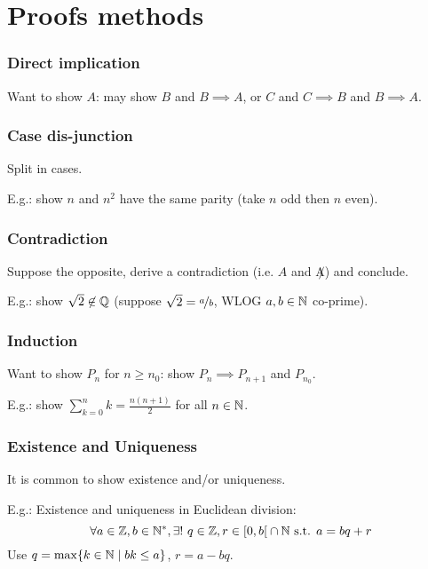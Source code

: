 \chapter{Proofs methods}

\subsection{Direct implication}
Want to show $A$: may show $B$ and $B \implies A$, or $C$ and $C \implies B$ and $B \implies A$.

\subsection{Case dis-junction}
Split in cases.

E.g.: show $n$ and $n^2$ have the same parity (take $n$ odd then $n$ even).

\subsection{Contradiction}
Suppose the opposite, derive a contradiction (i.e. $A$ and $\not A$) and conclude.

E.g.: show $\sqrt{2} \not\in \mathbb{Q}$ (suppose $\sqrt{2}=\nicefrac{a}{b}$, WLOG $a,b \in \mathbb{N}$ co-prime).

\subsection{Induction}
Want to show $P_n$ for $n \geq n_0$: show $P_n \implies P_{n+1}$ and $P_{n_0}$.

E.g.: show $\sum_{k=0}^{n} k = \frac{n(n+1)}{2}$ for all $n \in \mathbb{N}$.

\subsection{Existence and Uniqueness}
It is common to show existence and/or uniqueness.

E.g.: Existence and uniqueness in Euclidean division: 
$$\forall a \in \mathbb{Z}, b \in \mathbb{N}^*, \exists ! \ q \in \mathbb{Z}, r \in \left[ 0, b \right[ \cap \mathbb{N} \text{ s.t. } a=bq+r$$
Use $q = \max\{ k \in \mathbb{N} \mid bk \leq a \}$, $r = a-bq$.
